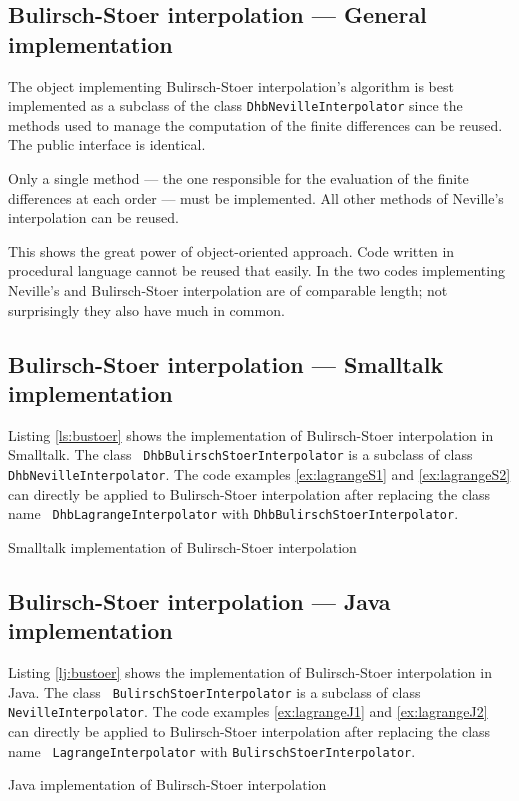 \documentclass[twoside]{book}
\begin{document}
\subsection{Bulirsch-Stoer interpolation --- General implementation}
 The object implementing
Bulirsch-Stoer interpolation's algorithm is best implemented as a
subclass of the class {\tt DhbNevilleInterpolator} since the
methods used to manage the computation of the finite differences
can be reused. The public interface is identical.

Only a single method --- the one responsible for the evaluation of
the finite differences at each order --- must be implemented. All
other methods of Neville's interpolation can be reused.

This shows the great power of object-oriented approach. Code
written in procedural language cannot be reused that easily. In
\cite{Press} the two codes implementing Neville's and
Bulirsch-Stoer interpolation are of comparable length; not
surprisingly they also have much in common.

\subsection{Bulirsch-Stoer interpolation --- Smalltalk implementation}
Listing \ref{ls:bustoer} shows the implementation of
Bulirsch-Stoer interpolation in Smalltalk. The class {\tt
DhbBulirschStoerInterpolator} is a subclass of class {\tt
DhbNevilleInterpolator}. The code examples \ref{ex:lagrangeS1} and
\ref{ex:lagrangeS2} can directly be applied to Bulirsch-Stoer
interpolation after replacing the class name {\tt
DhbLagrangeInterpolator} with {\tt DhbBulirschStoerInterpolator}.
\begin{listing}
  Smalltalk implementation of Bulirsch-Stoer interpolation
\label{ls:bustoer}

\end{listing}

\subsection{Bulirsch-Stoer interpolation --- Java implementation}
Listing \ref{lj:bustoer} shows the implementation of
Bulirsch-Stoer interpolation in Java. The class {\tt
BulirschStoerInterpolator} is a subclass of class {\tt
NevilleInterpolator}. The code examples \ref{ex:lagrangeJ1} and
\ref{ex:lagrangeJ2} can directly be applied to Bulirsch-Stoer
interpolation after replacing the class name {\tt
LagrangeInterpolator} with {\tt BulirschStoerInterpolator}.
\begin{listing}
  Java implementation of Bulirsch-Stoer interpolation
\label{lj:bustoer}

\end{listing}
\end{document}
